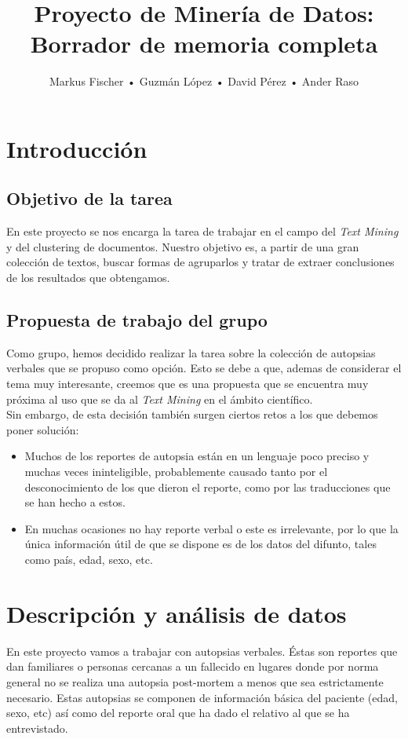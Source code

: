 \documentclass[10pt,a4paper,draft]{article}
\author{Markus Fischer • Guzmán López • David Pérez • Ander Raso}
\title{Proyecto de Minería de Datos: \linebreak Borrador de memoria completa}
\date{}
\begin{document}
\maketitle
\newpage

\tableofcontents
\newpage

\section{Introducción}
	\subsection{Objetivo de la tarea}
	En este proyecto se nos encarga la tarea de trabajar en el campo del \textit{Text Mining} y del clustering de documentos. Nuestro objetivo es, a partir de una gran colección de textos, buscar formas de agruparlos y tratar de extraer conclusiones de los resultados que obtengamos.
	\subsection{Propuesta de trabajo del grupo}
	Como grupo, hemos decidido realizar la tarea sobre la colección de autopsias verbales que se propuso como opción. Esto se debe a que, ademas de considerar el tema muy interesante, creemos que es una propuesta que se encuentra muy próxima al uso que se da al \textit{Text Mining} en el ámbito científico.\\
	
    Sin embargo, de esta decisión también surgen ciertos retos a los que debemos poner solución:
	\begin{itemize}
	\item Muchos de los reportes de autopsia están en un lenguaje poco preciso y muchas veces ininteligible, probablemente causado tanto por el desconocimiento de los que dieron el reporte, como por las traducciones que se han hecho a estos.
	\item En muchas ocasiones no hay reporte verbal o este es irrelevante, por lo que la única información útil de que se dispone es de los datos del difunto, tales como país, edad, sexo, etc.
	\end{itemize}

\section{Descripción y análisis de datos}
En este proyecto vamos a trabajar con autopsias verbales. Éstas son reportes que dan familiares o personas cercanas a un fallecido en lugares donde por norma general no se realiza una autopsia post-mortem a menos que sea estrictamente necesario. Estas autopsias se componen de información básica del paciente (edad, sexo, etc) así como del reporte oral que ha dado el relativo al que se ha entrevistado.\\
\end{document}
